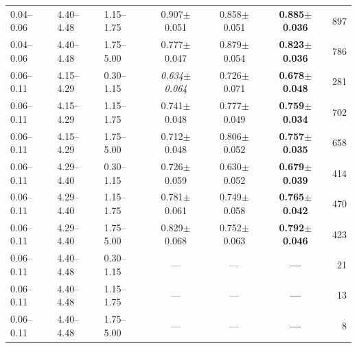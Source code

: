 \begin{tabular}{lllcccr}
0.04--0.06 & 4.40--4.48 & 1.15--1.75 & 0.907$\pm$0.051 & 0.858$\pm$0.051 & \textbf{0.885$\pm$0.036} & 897 \\
0.04--0.06 & 4.40--4.48 & 1.75--5.00 & 0.777$\pm$0.047 & 0.879$\pm$0.054 & \textbf{0.823$\pm$0.036} & 786 \\
0.06--0.11 & 4.15--4.29 & 0.30--1.15 & \textit{0.634$\pm$0.064} & 0.726$\pm$0.071 & \textbf{0.678$\pm$0.048} & 281 \\
0.06--0.11 & 4.15--4.29 & 1.15--1.75 & 0.741$\pm$0.048 & 0.777$\pm$0.049 & \textbf{0.759$\pm$0.034} & 702 \\
0.06--0.11 & 4.15--4.29 & 1.75--5.00 & 0.712$\pm$0.048 & 0.806$\pm$0.052 & \textbf{0.757$\pm$0.035} & 658 \\
0.06--0.11 & 4.29--4.40 & 0.30--1.15 & 0.726$\pm$0.059 & 0.630$\pm$0.052 & \textbf{0.679$\pm$0.039} & 414 \\
0.06--0.11 & 4.29--4.40 & 1.15--1.75 & 0.781$\pm$0.061 & 0.749$\pm$0.058 & \textbf{0.765$\pm$0.042} & 470 \\
0.06--0.11 & 4.29--4.40 & 1.75--5.00 & 0.829$\pm$0.068 & 0.752$\pm$0.063 & \textbf{0.792$\pm$0.046} & 423 \\
0.06--0.11 & 4.40--4.48 & 0.30--1.15 & --- & --- & \textbf{---} & 21 \\
0.06--0.11 & 4.40--4.48 & 1.15--1.75 & --- & --- & \textbf{---} & 13 \\
0.06--0.11 & 4.40--4.48 & 1.75--5.00 & --- & --- & \textbf{---} & 8 \\
\bottomrule\end{tabular}

\medskip


